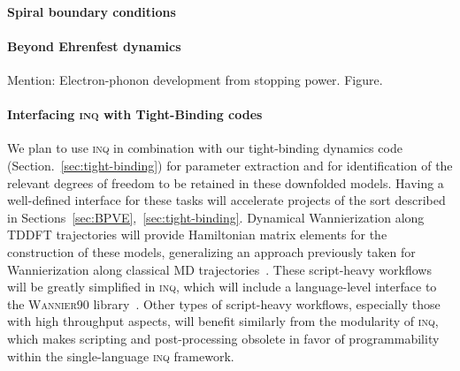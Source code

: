 
\paragraph{Spiral boundary conditions}

\paragraph{Beyond Ehrenfest dynamics} 
Mention: Electron-phonon development from stopping power.  Figure.

\paragraph{Interfacing \textsc{inq} with Tight-Binding codes}

We plan to use \textsc{inq} in combination with our tight-binding dynamics code (Section.~\ref{sec:tight-binding}) for parameter extraction and for identification of the relevant degrees of freedom to be retained in these downfolded models. 
Having a well-defined interface for these tasks will accelerate projects of the sort described in Sections~\ref{sec:BPVE},~\ref{sec:tight-binding}. Dynamical Wannierization along TDDFT trajectories will provide Hamiltonian matrix elements for the construction of these models, generalizing an approach previously taken for Wannierization along classical MD trajectories~\cite{Abramovitch2021}. 
These script-heavy workflows will be greatly simplified in \textsc{inq}, which will include a language-level interface to the \textsc{Wannier90} library~\cite{Mostofi2008}. 
Other types of script-heavy workflows, especially those with high throughput aspects, will benefit similarly from the modularity of \textsc{inq}, which makes scripting and post-processing obsolete in favor of programmability within the single-language \textsc{inq} framework.

